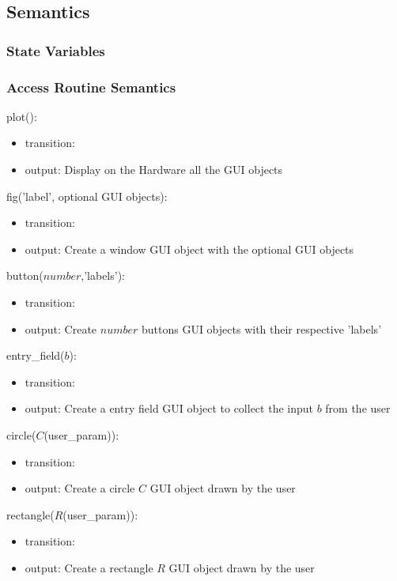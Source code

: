 \documentclass[12pt, titlepage]{article}
\begin{document}
\subsection{Semantics}

\subsubsection{State Variables}


\subsubsection{Access Routine Semantics}

\noindent plot():
\begin{itemize}
\item transition:
\item output: Display on the Hardware all the GUI objects 
\end{itemize}

\noindent fig('label', optional GUI objects):
\begin{itemize}
\item transition: 
\item output: Create a window GUI object with the optional GUI objects
\end{itemize}

\noindent button($number$,'labels'):
\begin{itemize}
\item transition:  
\item output: Create $number$ buttons GUI objects with their respective 'labels'
\end{itemize}

\noindent entry{\_}field($b$):
\begin{itemize}
\item transition:  
\item output: Create a entry field GUI object to collect the input $b$ from the user
\end{itemize}

\noindent circle($C$(user{\_}param)):
\begin{itemize}
\item transition:  
\item output: Create a circle $C$ GUI object drawn by the user 
\end{itemize}

\noindent rectangle($R$(user{\_}param)):
\begin{itemize}
\item transition:  
\item output: Create a rectangle $R$ GUI object drawn by the user 
\end{itemize}
\newpage
\end{document}
